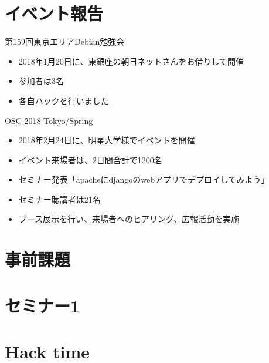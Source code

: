 \section{イベント報告}

\begin{frame}{第159回東京エリアDebian勉強会}
\begin{itemize}
\item 2018年1月20日に、東銀座の朝日ネットさんをお借りして開催
\item 参加者は3名
\item 各自ハックを行いました
\end{itemize} 
\end{frame}

\begin{frame}{OSC 2018 Tokyo/Spring}
\begin{itemize}
\item 2018年2月24日に、明星大学様でイベントを開催
\item イベント来場者は、2日間合計で1200名
\item セミナー発表「apacheにdjangoのwebアプリでデプロイしてみよう」
\item セミナー聴講者は21名
\item ブース展示を行い、来場者へのヒアリング、広報活動を実施
\end{itemize} 
\end{frame}


\section{事前課題}
{\footnotesize
 
}

%

\section{セミナー1}

\section{Hack time}

  
